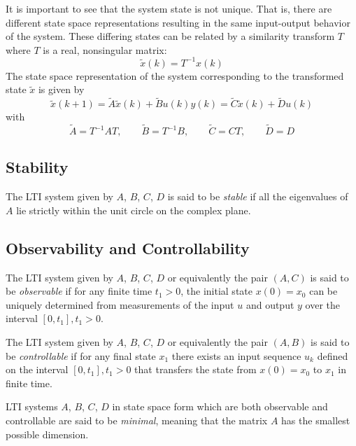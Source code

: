 It is important to see that the system state is not unique. That is, there are different state space representations resulting in the same input-output behavior of the system. These differing states can be related by a similarity transform $T$ where $T$ is a real, nonsingular matrix:
\begin{equation*}
\tilde{x}(k) = T^{-1}x(k)
\end{equation*}
The state space representation of the system corresponding to the transformed state $\tilde{x}$ is given by
\begin{subequations}
\begin{equation*}\tilde{x}(k+1) = \tilde{A}\tilde{x}(k) + \tilde{B}u(k)\end{equation*}
\begin{equation*}y(k) = \tilde{C}\tilde{x}(k) + \tilde{D}u(k)\end{equation*}
\end{subequations}
with
\begin{equation*}
\tilde{A} = T^{-1}AT, \qquad
\tilde{B} = T^{-1}B, \qquad
\tilde{C} = CT, \qquad
\tilde{D} = D
\end{equation*}

\subsection{Stability}
The LTI system given by $A$, $B$, $C$, $D$ is said to be \textit{stable} if all the eigenvalues of $A$ lie strictly within the unit circle on the complex plane.

\subsection{Observability and Controllability}
The LTI system given by $A$, $B$, $C$, $D$ or equivalently the pair $(A,C)$ is said to be \textit{observable} if for any finite time $t_1 > 0$, the initial state $x(0) = x_0$ can be uniquely determined from measurements of the input $u$ and output $y$ over the interval $[0, t_1], t_1>0$.

The LTI system given by $A$, $B$, $C$, $D$ or equivalently the pair $(A,B)$ is said to be \textit{controllable} if for any final state $x_1$ there exists an input sequence $u_k$ defined on the interval $[0, t_1], t_1>0$ that transfers the state from $x(0) = x_0$ to $x_1$ in finite time.

LTI systems $A$, $B$, $C$, $D$ in state space form which are both observable and controllable are said to be \textit{minimal}, meaning that the matrix $A$ has the smallest possible dimension.

